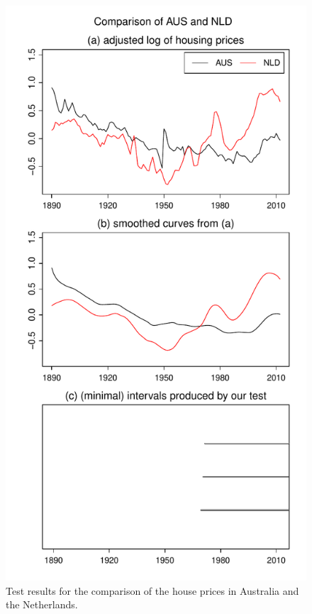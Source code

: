 \documentclass[12pt]{article}
\begin{document}
\begin{figure}
\begin{minipage}[t]{0.24\textwidth}
\includegraphics[width=\textwidth]{../output/plots/hp/AUS_vs_NLD}
\caption{Test results for the comparison of the house prices in Australia and the Netherlands.}\label{fig:hp:Australia:Netherlands}
\end{minipage}

\end{figure}
\end{document}
